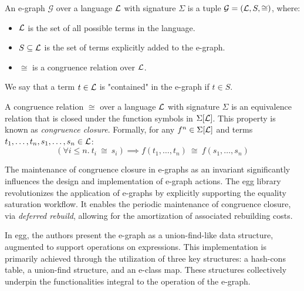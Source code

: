 \begin{definition}[E-graph]
An e-graph $\mathcal{G}$ over a language $\mathcal{L}$ with signature $\Sigma$ is a tuple $\mathcal{G} = (\mathcal{L}, S, \cong)$, where:
\begin{itemize}
    \item $\mathcal{L}$ is the set of all possible terms in the language.
    \item $S \subseteq \mathcal{L}$ is the set of terms explicitly added to the e-graph.
    \item $\cong$ is a congruence relation over $\mathcal{L}$.
\end{itemize}
We say that a term $t \in \mathcal{L}$ is "contained" in the e-graph if $t \in S$.
\end{definition}

\begin{definition}
A congruence relation $\cong$ over a language $\mathcal{L}$ with signature $\Sigma$ is an equivalence relation that is closed under the function symbols in $\Sigma[\mathcal{L}]$.
This property is known as \emph{congruence closure}. 
Formally, for any $f^n \in \Sigma[\mathcal{L}]$ and terms $t_1, \ldots, t_n, s_1, \ldots, s_n \in \mathcal{L}$:
\[
(\forall i \leq n.~t_i~\cong~s_i) \implies f(t_1, \ldots, t_n)~\cong~f(s_1, \ldots, s_n)
\]
\end{definition}

The maintenance of congruence closure in e-graphs as an invariant significantly influences the design and implementation of e-graph actions.
The egg library~\cite{egg} revolutionizes the application of e-graphs by explicitly supporting the equality saturation workflow.
It enables the periodic maintenance of congruence closure, via \emph{deferred rebuild}, allowing for the amortization of associated rebuilding costs.

In egg, the authors present the e-graph as a union-find-like data structure, augmented to support operations on expressions.
This implementation is primarily achieved through the utilization of three key structures: a hash-cons table, a union-find structure, and an e-class map.
These structures collectively underpin the functionalities integral to the operation of the e-graph.

